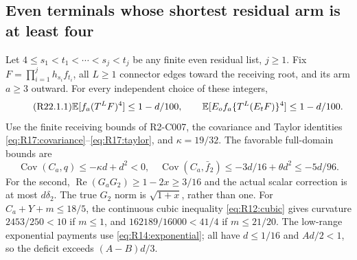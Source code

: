 \subsection{Even terminals whose shortest residual arm is at least four}\label{proof:R2-C022}
Let $4\le s_1<t_1<\cdots<s_j<t_j$ be any finite even residual list,
$j\ge1$. Fix $F=\prod_{i=1}^jh_{s_i}f_{t_i}$, all $L\ge1$
connector edges toward the receiving root, and its arm $a\ge3$
outward. For every independent choice of these integers,
\begin{equation}\tag{R22.1.1}\label{eq:R22:claim}
\mathbb E[f_a(T^LF)^4]\le1-d/100,
\qquad \mathbb E[E_of_a\{T^L(E_tF)\}^4]\le1-d/100.
\end{equation}
Use the finite receiving bounds of R2-C007,
the covariance and Taylor identities
\eqref{eq:R17:covariance}--\eqref{eq:R17:taylor}, and
$\kappa=19/32$. The favorable full-domain bounds are
\[
\operatorname{Cov}(C_a,q)\le-\kappa d+d^2<0,\quad
\operatorname{Cov}(C_a,\bar f_2)\le-3d/16+\theta d^2\le-5d/96.
\]
For the second, $\operatorname{Re}(G_aG_2)\ge1-2x\ge3/16$ and
the actual scalar correction is at most $d\delta_2$.
The true $G_2$ norm is $\sqrt{1+x}$, rather than one.
For $C_a+Y+m\le18/5$, the continuous cubic inequality
\eqref{eq:R12:cubic} gives curvature $2453/250<10$ if $m\le1$,
and $162189/16000<41/4$ if $m\le21/20$.
The low-range exponential payments use
\eqref{eq:R14:exponential}; all have $d\le1/16$ and $Ad/2<1$,
so the deficit exceeds $(A-B)d/3$.

